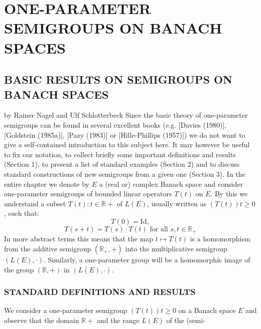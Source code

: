 
\usepackage{csquotes}
\usepackage{enumitem}

\part{ONE-PARAMETER SEMIGROUPS ON BANACH SPACES}
\chapter{BASIC RESULTS ON SEMIGROUPS ON BANACH SPACES}
by Rainer Nagel and Ulf Schlotterbeck
Since the basic theory of one-parameter semigroups can be found in several excellent books (e.g. [Davies (1980)], [Goldstein (1985a)], [Pazy (1983)] or [Hille-Phillips (1957)]) we do not want to give a self-contained introduction to this subject here.
It may however be useful to fix our notation, to collect briefly some important definitions and results (Section 1), to present a list of standard examples (Section 2) and to discuss standard constructions of new semigroups from a given one (Section 3).
In the entire chapter we denote by $E$ a (real or) complex Banach space and consider one-parameter semigroups of bounded linear operators $T(t)$ on $E$.
By this we understand a subset ${T(t) : t \in \mathbb{R}{+}}$ of $L(E)$, usually written as $(T(t)){t \geq 0}$, such that:
\[
	T(0) = \text{Id},
\]
\[
	T(s+t) = T(s) \cdot T(t) \text{ for all } s, t \in \mathbb{R}_{+}
\]
In more abstract terms this means that the map $t \mapsto T(t)$ is a homomorphism from the additive semigroup $(\mathbb{R}_{+},+)$ into the multiplicative semigroup $(L(E),\cdot)$.
Similarly, a one-parameter group will be a homomorphic image of the group $(\mathbb{R},+)$ in $(L(E),\cdot)$.
\section{STANDARD DEFINITIONS AND RESULTS}
We consider a one-parameter semigroup $(T(t)){t \geq 0}$ on a Banach space $E$ and observe that the domain $\mathbb{R}{+}$ and the range $L(E)$ of the (semi-


